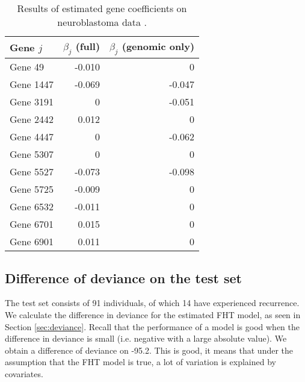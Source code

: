 \begin{table}
\caption{Results of estimated gene coefficients on neuroblastoma data \citep{oberthuer-data}.}
\label{tab:oberthuer-beta}
\centering
\begin{tabular}{lrr}
\toprule
Gene $j$      & $\beta_j$ (full) & $\beta_j$ (genomic only)\\
\hline
Gene 49   & -0.010  &      0  \\
Gene 1447 & -0.069  & -0.047  \\
Gene 3191 &      0  & -0.051  \\
Gene 2442 &  0.012  &      0  \\
Gene 4447 &      0  & -0.062  \\
Gene 5307 &      0  &      0  \\
Gene 5527 & -0.073  & -0.098  \\
Gene 5725 & -0.009  &      0  \\
Gene 6532 & -0.011  &      0  \\
Gene 6701 &  0.015  &      0  \\
Gene 6901 &  0.011  &      0  \\
\bottomrule
\end{tabular}
\end{table}


\subsection{Difference of deviance on the test set}
The test set consists of 91 individuals, of which 14 have experienced recurrence.
We calculate the difference in deviance for the estimated FHT model, as seen in Section \ref{sec:deviance}.
Recall that the performance of a model is good when the difference in deviance is small (i.e. negative with a large absolute value).
We obtain a difference of deviance on -95.2.
This is good, it means that under the assumption that the FHT model is true, a lot of variation is explained by covariates.

